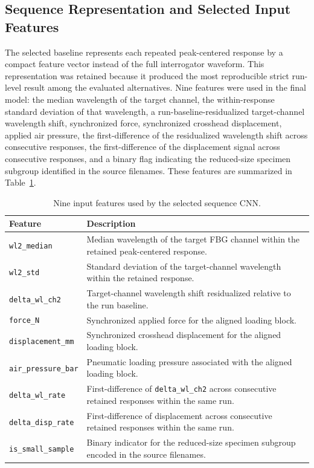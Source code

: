 \documentclass[notspecified,article,submit,pdftex,moreauthors]{Definitions/mdpi}
\begin{document}
\subsection{Sequence Representation and Selected Input Features}

The selected baseline represents each repeated peak-centered response by a compact feature vector instead of the full interrogator waveform. This representation was retained because it produced the most reproducible strict run-level result among the evaluated alternatives. Nine features were used in the final model: the median wavelength of the target channel, the within-response standard deviation of that wavelength, a run-baseline-residualized target-channel wavelength shift, synchronized force, synchronized crosshead displacement, applied air pressure, the first-difference of the residualized wavelength shift across consecutive responses, the first-difference of the displacement signal across consecutive responses, and a binary flag indicating the reduced-size specimen subgroup identified in the source filenames. These features are summarized in Table~\ref{tab:input_summary}.

\begin{table}[H]
\caption{Nine input features used by the selected sequence CNN.\label{tab:input_summary}}
\begin{tabularx}{\textwidth}{p{}X}
\toprule
\textbf{Feature} & \textbf{Description} \\
\midrule
\texttt{wl2\_median} & Median wavelength of the target FBG channel within the retained peak-centered response. \\
\texttt{wl2\_std} & Standard deviation of the target-channel wavelength within the retained response. \\
\texttt{delta\_wl\_ch2} & Target-channel wavelength shift residualized relative to the run baseline. \\
\texttt{force\_N} & Synchronized applied force for the aligned loading block. \\
\texttt{displacement\_mm} & Synchronized crosshead displacement for the aligned loading block. \\
\texttt{air\_pressure\_bar} & Pneumatic loading pressure associated with the aligned loading block. \\
\texttt{delta\_wl\_rate} & First-difference of \texttt{delta\_wl\_ch2} across consecutive retained responses within the same run. \\
\texttt{delta\_disp\_rate} & First-difference of displacement across consecutive retained responses within the same run. \\
\texttt{is\_small\_sample} & Binary indicator for the reduced-size specimen subgroup encoded in the source filenames. \\
\bottomrule
\end{tabularx}
\end{table}
\end{document}
